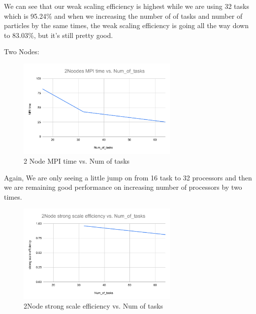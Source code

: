 \documentclass{article}
\begin{document}
We can see that our weak scaling efficiency is highest while we are using 32 tasks which is 95.24\% and when we increasing the number of of tasks and number of particles by the same times, the weak scaling efficiency is going all the way down to 83.03\%, but it's still pretty good.

Two Nodes:
\begin{figure}[H] %
\centering %
\includegraphics[width=0.7\textwidth]{2Nodes MPI time vs. Num_of_tasks.pdf} %
\caption{2 Node MPI time vs. Num of tasks} %
\label{2 Nodes MPI time vs. Num_of_tasks} %
\end{figure}

Again, We are only seeing a little jump on from 16 task to 32 processors and then we are remaining good performance on increasing number of processors by two times.


\begin{figure}[H] %
\centering %
\includegraphics[width=0.7\textwidth]{2Node strong scale efficiency vs. Num_of_tasks.pdf} %
\caption{2Node strong scale efficiency vs. Num of tasks} %
\label{2Node strong scale efficiency vs. Num_of_tasks} %
\end{figure}
\end{document}
